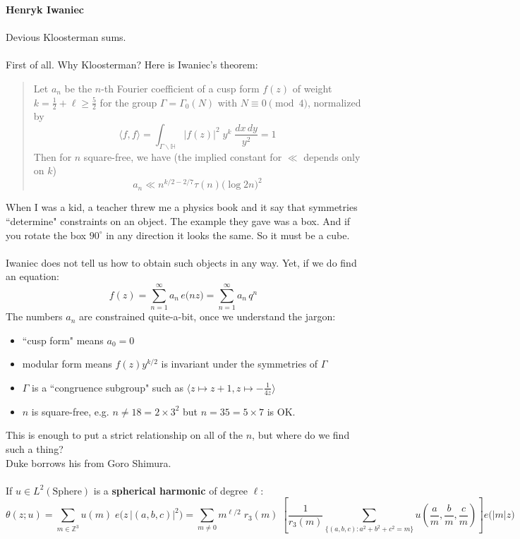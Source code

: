 \documentclass[12pt]{article}
\begin{document}
\newpage 

\noindent \textbf{Henryk Iwaniec} \\ \\
Devious Kloosterman sums. \\ \\
First of all.  Why Kloosterman?  Here is Iwaniec's theorem: 
\begin{quotation} 
Let $a_n$ be the $n$-th Fourier coefficient of a cusp form $f(z)$ of weight $k = \frac{1}{2} + \ell \geq \frac{5}{2}$ for the group $\Gamma = \Gamma_0(N)$ with $N \equiv 0 \pmod 4$, normalized by 
$$ \langle f, f \rangle = \int_{\Gamma \backslash \mathbb{H}} \big| f(z) \big|^2 \; y^k \; \frac{dx \, dy}{y^2 } = 1$$ 
Then for $n$ square-free, we have (the implied constant for $\ll$ depends only on $k$)
$$  a_n \ll n^{k/2 - 2/7} \tau (n) \big( \log 2n \big)^2 $$
\end{quotation}
When I was a kid, a teacher threw me a physics book and it say that symmetries ``determine" constraints on an object.  The example they gave was a box.  And if you rotate the box $90^\circ$ in any direction it looks the same.   So it must be a cube. \\ \\
Iwaniec does not tell us how to obtain such objects in any way.  Yet, if we do find an equation:
$$ f(z) = \sum_{n=1}^\infty a_n \, e \big( n z \big) 
= \sum_{n=1}^\infty a_n \, q^n $$
The numbers $a_n$ are constrained quite-a-bit, once we understand the jargon:
\begin{itemize}
\item ``cusp form" means $a_0 = 0$
\item modular form means $f(z) y^{k/2}$ is invariant under the symmetries of $\Gamma$
\item $\Gamma$ is a ``congruence subgroup" such as $\big\langle z \mapsto z + 1, z \mapsto - \frac{1}{4z} \big\rangle$
\item $n$ is square-free, e.g. $n \neq 18 = 2 \times 3^2 $ but $n = 35 = 5 \times 7$ is OK.
\end{itemize}
This is enough to put a strict relationship on all of the $n$, but where do we find such a thing? \\ Duke borrows his from Goro Shimura. \\ \\ If $u \in L^2 (\text{Sphere})$ is a \textbf{spherical harmonic} of degree $\ell$:
$$ \theta(z; u) = \sum_{m \in \mathbb{Z}^3} u(m) \; e \big(z \,|(a,b,c)|^2 \big)  =  \sum_{m \neq  0} m^{\ell/2} \; r_3(m) \; \left[ \frac{1}{r_3(m)} \sum_{ \{(a,b,c): a^2 + b^2 + c^2 = m  \}} u\left(\frac{a}{m},\frac{b}{m},\frac{c}{m} \right) \right] e \big( |m| z \big)  $$
\end{document}

